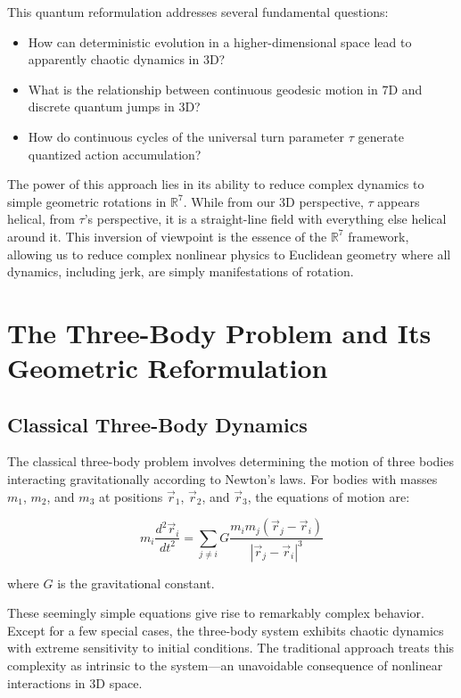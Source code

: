 \documentclass{article}
\begin{document}
This quantum reformulation addresses several fundamental questions:
\begin{itemize}
\item How can deterministic evolution in a higher-dimensional space lead to apparently chaotic dynamics in 3D?
\item What is the relationship between continuous geodesic motion in 7D and discrete quantum jumps in 3D?
\item How do continuous cycles of the universal turn parameter $\tau$ generate quantized action accumulation?
\end{itemize}

The power of this approach lies in its ability to reduce complex dynamics to simple geometric rotations in $\mathbb{R}^7$. While from our 3D perspective, $\tau$ appears helical, from $\tau$'s perspective, it is a straight-line field with everything else helical around it. This inversion of viewpoint is the essence of the $\mathbb{R}^7$ framework, allowing us to reduce complex nonlinear physics to Euclidean geometry where all dynamics, including jerk, are simply manifestations of rotation.

\section{The Three-Body Problem and Its Geometric Reformulation}

\subsection{Classical Three-Body Dynamics}

The classical three-body problem involves determining the motion of three bodies interacting gravitationally according to Newton's laws. For bodies with masses $m_1$, $m_2$, and $m_3$ at positions $\vec{r}_1$, $\vec{r}_2$, and $\vec{r}_3$, the equations of motion are:

\begin{equation}
m_i \frac{d^2\vec{r}_i}{dt^2} = \sum_{j \neq i} G \frac{m_i m_j (\vec{r}_j - \vec{r}_i)}{|\vec{r}_j - \vec{r}_i|^3}
\end{equation}

where $G$ is the gravitational constant.

These seemingly simple equations give rise to remarkably complex behavior. Except for a few special cases, the three-body system exhibits chaotic dynamics with extreme sensitivity to initial conditions. The traditional approach treats this complexity as intrinsic to the system—an unavoidable consequence of nonlinear interactions in 3D space.
\end{document}
